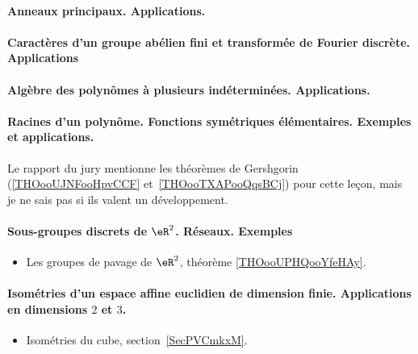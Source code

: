 \paragraph{Anneaux principaux. Applications.}
\paragraph{Caractères d'un groupe abélien fini et transformée de Fourier discrète. Applications}
\paragraph{Algèbre des polynômes à plusieurs indéterminées. Applications.}
\paragraph{Racines d'un polynôme. Fonctions symétriques élémentaires. Exemples et applications.}

Le rapport du jury mentionne les théorèmes de Gershgorin (\ref{THOooUJNFooHpvCCF} et~\ref{THOooTXAPooQqsBCj}) pour cette leçon, mais je ne sais pas si ils valent un développement.

\paragraph{Sous-groupes discrets de \( \eR^2\). Réseaux. Exemples}
\begin{itemize}
    \item Les groupes de pavage de \( \eR^2\), théorème \ref{THOooUPHQooYfeHAy}.
\end{itemize}
\paragraph{Isométries d'un espace affine euclidien de dimension finie. Applications en dimensions $2$ et $3$.}
\begin{itemize}
    \item Isométries du cube, section~\ref{SecPVCmkxM}.
\end{itemize}
